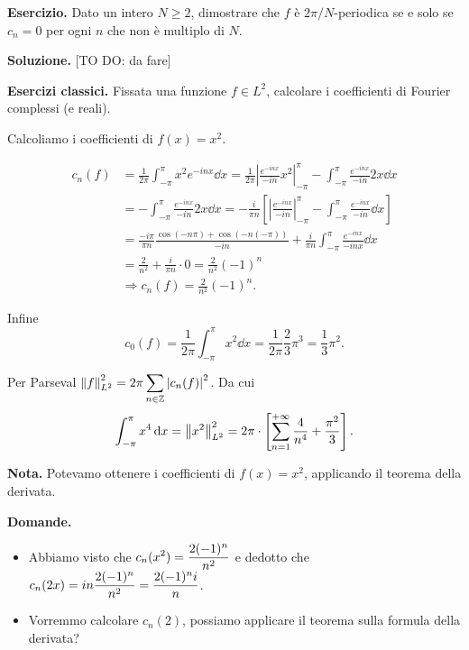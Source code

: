 
\textbf{Esercizio.} Dato un intero $N \geq 2$, dimostrare che $f$ è $2\pi/N$-periodica se e solo se $c_n = 0$ per ogni $n$ che non è multiplo di $N$.

\textbf{Soluzione.} [TO DO: da fare]


\textbf{Esercizi classici.} Fissata una funzione $f \in L^2$, calcolare i coefficienti di Fourier complessi (e reali).

Calcoliamo i coefficienti di $f(x) = x^2$.

\begin{align*}
	c_n(f) & = \frac{1}{2\pi} \int_{-\pi}^\pi x^2 e^{-inx} \dd x = \frac{1}{2\pi} \left| \frac{e^{-inx}}{-in} x^2 \right|_{-\pi}^\pi - \int_{-\pi}^\pi \frac{e^{-inx}}{-in} 2x \dd x \\
	& = - \int_{-\pi}^\pi \frac{e^{-inx}}{-in} 2x \dd x = -\frac{i}{\pi n} \left[ \left| \frac{e^{-inx}}{-in} \right|_{-\pi}^\pi - \int_{-\pi}^\pi \frac{e^{-inx}}{-in} \dd x  \right] \\
	& = \frac{-i \pi}{\pi n} \frac{\cos(-n\pi) + \cos(-n (-\pi))}{-in} + \frac{i}{\pi n} \int_{-\pi}^\pi \frac{e^{-inx}}{-inx} \dd x \\
	& = \frac{2}{n^2} + \frac{i}{\pi n} \cdot 0 = \frac{2}{n^2} (-1)^n \\
	& \Longrightarrow c_n(f) = \frac{2}{n^2} (-1)^n.
\end{align*}

Infine
%
$$
c_0(f) = \frac{1}{2\pi} \int_{-\pi}^\pi x^2 \dd x = \frac{1}{2\pi} \frac{2}{3} \pi^3 = \frac{1}{3} \pi^2.
$$
%

Per Parseval $\displaystyle \left\lVert f \right\rVert_{L^2}^2 = 2\pi \sum_{n \in \mathbb Z} \left| c_n(f) \right|^2$.
Da cui
%
$$
\int_{-\pi}^\pi x^4 \,\mathrm{d} x = \left\lVert x^2 \right\rVert_{L^2}^2 = 2\pi \cdot \left[ \sum_{n=1}^{+\infty} \frac{4}{n^4} + \frac{\pi^2}{3}  \right].
$$
%

\textbf{Nota.} Potevamo ottenere i coefficienti di $f(x) = x^2$, applicando il teorema della derivata.

\textbf{Domande.}
\begin{itemize}

	\item Abbiamo visto che $\displaystyle c_n(x^2) = \frac{2 (-1)^n}{n^2}$ e dedotto che $\displaystyle c_n(2x) = in \frac{2(-1)^n}{n^2} = \frac{2(-1)^n i}{n}$.


	\item Vorremmo calcolare $c_n(2)$, possiamo applicare il teorema sulla formula della derivata?

\end{itemize}

